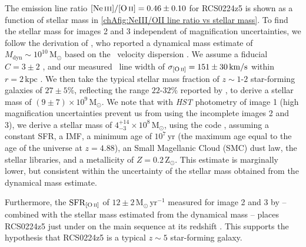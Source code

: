 The emission line ratio $\NeIII/\OII = 0.46 \pm 0.10$ for RCS0224z5 is shown as a function of stellar mass in \cref{chAfig:NeIII/OII line ratio vs stellar mass}. To find the stellar mass for images 2 and 3 independent of magnification uncertainties, we follow the derivation of \citet{2007MNRAS.376..479S}, who reported a dynamical mass estimate of $M_\text{dyn} \sim 10^{10} \, \mathrm{M}_\odot$ based on the \OII\ velocity dispersion \citep[via equation (1) in][]{2006ApJ...646..107E}. We assume a fiducial $C = 3 \pm 2$ \citep[with high uncertainty to reflect the range of possible values depending on mass distribution and velocity field, see][]{2006ApJ...646..107E}, and our measured \OII\ line width of $\sigma_\OII = 151 \pm 30 \, \mathrm{km/s}$ within $r = 2 \, \mathrm{kpc}$ \citep[following][]{2007MNRAS.376..479S}. We then take the typical stellar mass fraction of $z \sim 1$-$2$ star-forming galaxies of $27 \pm 5\%$, reflecting the range $22$-$32\%$ reported by \citet[; see also \citealt{2016ApJ...831..149W}]{2016MNRAS.457.1888S}, to derive a stellar mass of $(9 \pm 7) \times 10^{9} \, \mathrm{M}_\odot$. We note that with \textit{HST} photometry of image 1 (high magnification uncertainties prevent us from using the incomplete images 2 and 3), we derive a stellar mass of $4_{-3}^{+14} \times 10^8 \, \mathrm{M_\odot}$, using the  code \citep[Fitting and Assessment of Synthetic Templates;][]{2009ApJ...700..221K}, assuming a constant SFR, a \citet{2003PASP..115..763C} IMF, a minimum age of $10^7 \, \mathrm{yr}$ (the maximum age equal to the age of the universe at $z = 4.88$), an Small Magellanic Cloud (SMC) dust law, the \citet{2003MNRAS.344.1000B} stellar libraries, and a metallicity of $Z = 0.2 \, \mathrm{Z_\odot}$. This estimate is marginally lower, but consistent within the uncertainty of the stellar mass obtained from the dynamical mass estimate.

Furthermore, the $\mathrm{SFR}_\OII$ of $12 \pm 2 \, \mathrm{M_\odot \, yr^{-1}}$ measured for image 2 and 3 by \citet{2007MNRAS.376..479S} -- combined with the stellar mass estimated from the dynamical mass -- places RCS0224z5 just under on the main sequence at its redshift \citep[e.g.][; a lower stellar mass, as suggested by the SED modelling, would shift it onto the main sequence]{2015ApJ...799..183S}. This supports the hypothesis that RCS0224z5 is a typical $z \sim 5$ star-forming galaxy.


